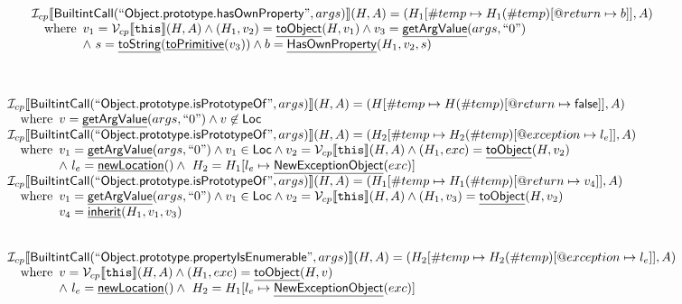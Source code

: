 \documentclass{article}
\makeatletter
\newcommand{\SF}[1]{\mbox{\textsf{#1}}}
\newcommand{\TT}[1]{\mbox{\texttt{#1}}}
\newcommand{\wherec}[1]{{\rm where}\begin{array}[t]{l}#1\end{array}}
\newcommand{\Loc}{\SF{Loc}}
\newcommand{\I}{\mathcal{I}}
\newcommand{\V}{\mathcal{V}}
\newcommand{\lbr}{\llbracket}
\newcommand{\rbr}{\rrbracket}
\newcommand{\hf}[1]{\underline{\sf #1}}
\newcommand{\varloc}[1]{\##1}
\newcommand{\varprop}[1]{@#1}
\makeatother
\begin{document}
\[\begin{array}{l}
\I _{cp}\lbr \SF{BuiltintCall}(``\SF{Object.prototype.hasOwnProperty}",args)\rbr(H,A)
 = (H_1[\varloc{temp}\mapsto H_1(\varloc{temp})[\varprop{return}\mapsto b]], A) \\
\quad\wherec{
  v_1 = \V _{cp}\lbr \TT{this}\rbr (H,A) \land (H_1, v_2) = \hf{toObject}(H, v_1)
  \land v_3 =  \hf{getArgValue}(args, ``0")\\
  \land\ s = \hf{toString}(\hf{toPrimitive}(v_3)) \land b = \hf{HasOwnProperty}(H_1, v_2, s)
  }\\
\\\\
\end{array}
\]

\[
\begin{array}{l}

\I _{cp}\lbr \SF{BuiltintCall}(``\SF{Object.prototype.isPrototypeOf}",args)\rbr(H,A)
 = (H[\varloc{temp}\mapsto H(\varloc{temp})[\varprop{return}\mapsto \SF{false}]], A) \\
\quad\wherec{
  v =  \hf{getArgValue}(args, ``0") \land v \not\in \Loc
  }\\

\I _{cp}\lbr \SF{BuiltintCall}(``\SF{Object.prototype.isPrototypeOf}",args)\rbr(H,A)
 = (H_2[\varloc{temp}\mapsto H_2(\varloc{temp})[\varprop{exception}\mapsto l_e]], A) \\
\quad\wherec{
  v_1 =  \hf{getArgValue}(args, ``0") \land v_1 \in \Loc
  \land v_2 = \V _{cp}\lbr \TT{this}\rbr (H,A) \land (H_1, exc) = \hf{toObject}(H, v_2) \\
  \land\ l_e = \hf{newLocation}() \land\ H_2=H_1[l_e\mapsto\hf{NewExceptionObject}(exc)] 
  }\\

\I _{cp}\lbr \SF{BuiltintCall}(``\SF{Object.prototype.isPrototypeOf}",args)\rbr(H,A)
 = (H_1[\varloc{temp}\mapsto H_1(\varloc{temp})[\varprop{return}\mapsto v_4]], A) \\
\quad\wherec{
  v_1 =  \hf{getArgValue}(args, ``0") \land v_1 \in \Loc
  \land v_2 = \V _{cp}\lbr \TT{this}\rbr (H,A) \land (H_1, v_3) = \hf{toObject}(H, v_2) \\
  v_4 = \hf{inherit}(H_1, v_1, v_3)
  }\\
\\\\



\I _{cp}\lbr \SF{BuiltintCall}(``\SF{Object.prototype.propertyIsEnumerable}",args)\rbr(H,A)
 = (H_2[\varloc{temp}\mapsto H_2(\varloc{temp})[\varprop{exception}\mapsto l_e]], A) \\
\quad\wherec{
  v = \V _{cp}\lbr \TT{this}\rbr (H,A) \land (H_1, exc) = \hf{toObject}(H, v) \\
  \land\ l_e = \hf{newLocation}() \land\ H_2=H_1[l_e\mapsto\hf{NewExceptionObject}(exc)] 
  }\\


\end{array}\]
\end{document}
